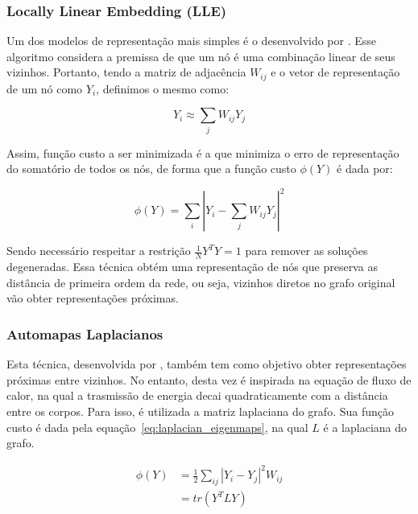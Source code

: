 \subsubsection{Locally Linear Embedding (LLE)}

Um dos modelos de representação mais simples é o desenvolvido por \citet{roweis00}.
Esse algoritmo considera a premissa de que um nó é uma combinação linear de
seus vizinhos.
Portanto, tendo a matriz de adjacência $W_{ij}$ e o vetor de representação de um
nó como $Y_i$, definimos o mesmo como:

\begin{equation}
    Y_i \approx \sum_j{W_{ij}Y_j}
\end{equation}

Assim, função custo a ser minimizada é a que minimiza o erro de representação
do somatório de todos os nós, de forma que a função custo $\phi(Y)$
é dada por:

\begin{equation}
    \phi(Y) = \sum_i{|Y_i - \sum_j{W_{ij}Y_j}|^2}
\end{equation}

Sendo necessário respeitar a restrição $\frac{1}{N}Y^TY = 1$ para remover as
soluções degeneradas.
Essa técnica obtém uma representação de nós que preserva as distância de
primeira ordem da rede, ou seja, vizinhos diretos no grafo original vão obter
representações próximas.

\subsubsection{Automapas Laplacianos}

Esta técnica, desenvolvida por \citet{belkin02}, também tem como objetivo obter
representações próximas entre vizinhos.
No entanto, desta vez é inspirada na equação de fluxo de calor, na qual a trasmissão de
energia decai quadraticamente com a distância entre os corpos.
Para isso, é utilizada a matriz laplaciana do grafo.
Sua função custo é dada pela equação~\ref{eq:laplacian_eigenmaps}, na qual $L$ é
a laplaciana do grafo.

\begin{equation} \label{eq:laplacian_eigenmaps}
\begin{aligned}
    \phi(Y) &= \frac{1}{2} \sum_{ij}{|Y_i - Y_j|^2 W_{ij}} \\
            &= tr(Y^TLY)
\end{aligned}
\end{equation}

